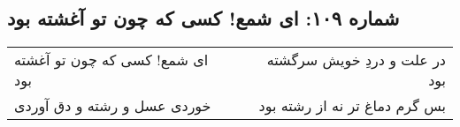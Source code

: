 \begin{center}
\section*{شماره ۱۰۹: ای شمع! کسی که چون تو آغشته بود}
\label{sec:109}
\begin{longtable}{l p{0.5cm} r}
ای شمع! کسی که چون تو آغشته بود
&&
در علت و دردِ خویش سرگشته بود
\\
خوردی عسل و رشته و دق آوردی
&&
بس گرم دماغ تر نه از رشته بود
\\
\end{longtable}
\end{center}
